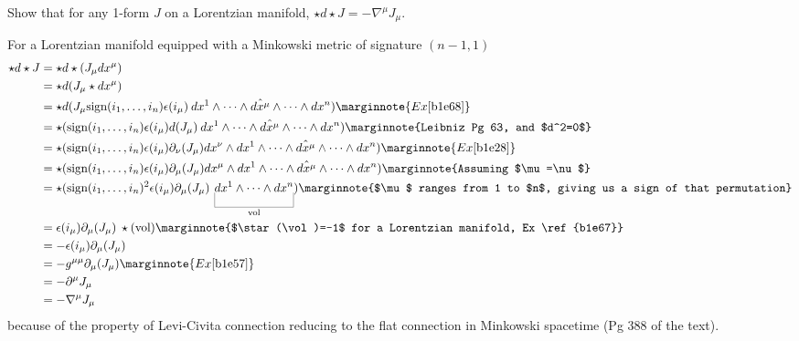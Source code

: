 \documentclass[10pt]{article}
\begin{document}
\begin{example}
	Show that for any 1-form $J$ on a Lorentzian manifold, $\star d\star J = -\nabla^\mu J_\mu$.
\end{example}
\sol For a Lorentzian manifold equipped with a Minkowski metric of signature $(n-1,1)$
$$
\begin{aligned}
	\star d\star J &= \star d\star (J_\mu dx^\mu)\\
	&= \star d (J_\mu \star dx^\mu)\\
	&= \star d (J_\mu \sign(i_1,\dots,i_n) \epsilon(i_\mu)\: dx^1\wedge\cdots \wedge\hat{dx^\mu} \wedge\cdots \wedge dx^n)\marginnote{Ex \ref{b1e68}}\\
	&= \star (\sign(i_1,\dots,i_n) \epsilon(i_\mu) d(J_\mu)\: dx^1\wedge\cdots \wedge\hat{dx^\mu} \wedge\cdots \wedge dx^n)\marginnote{Leibniz Pg 63, and $d^2=0$}\\
	&= \star (\sign(i_1,\dots,i_n) \epsilon(i_\mu) \partial_\nu(J_\mu)dx^\nu\wedge dx^1\wedge\cdots \wedge\hat{dx^\mu} \wedge\cdots \wedge dx^n)\marginnote{Ex \ref{b1e28}}\\
	&= \star (\sign(i_1,\dots,i_n) \epsilon(i_\mu) \partial_\mu(J_\mu)dx^\mu\wedge dx^1\wedge\cdots \wedge\hat{dx^\mu} \wedge\cdots \wedge dx^n)\marginnote{Assuming $\mu=\nu$}\\
	&= \star (\sign(i_1,\dots,i_n)^2 \epsilon(i_\mu) \partial_\mu(J_\mu)\: \ub{dx^1\wedge\cdots\wedge dx^n}{\vol})\marginnote{$\mu$ ranges from 1 to $n$, giving us a sign of that permutation}\\
	&= \epsilon(i_\mu) \partial_\mu(J_\mu)\:\star(\vol)\marginnote{$\star(\vol)=-1$ for a Lorentzian manifold, Ex \ref{b1e67}}\\
	&= -\epsilon(i_\mu) \partial_\mu(J_\mu)\\
	&= -g^{\mu\mu} \partial_\mu(J_\mu)\marginnote{Ex \ref{b1e57}}\\
	&= -\partial^\mu J_\mu\\
	&= -\nabla^\mu J_\mu
\end{aligned}
$$
because of the property of Levi-Civita connection reducing to the flat connection in Minkowski spacetime (Pg 388 of the text).
\end{document}
